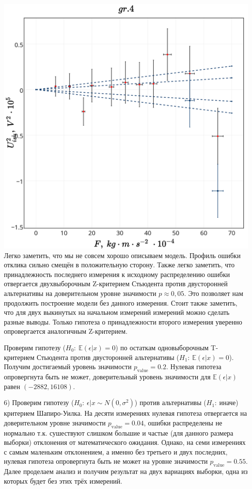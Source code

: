 \includegraphics[scale = 0.20]{my_plot4.png}\\

Легко заметить, что мы не совсем хорошо описываем модель. Профиль ошибки отклика сильно смещён в положительную сторону. Также легко заметить, что принадлежность последнего измерения к исходному распределению ошибки отвергается двухвыборочным Z-критерием Стьюдента против двусторонней альтернативы на доверительном уровне значимости $p\approx 0,05$. Это позволяет нам продолжить построение модели без данного измерения. Стоит также заметить, что для двух выкинутых на начальном измерений измерений можно сделать разные выводы. Только гипотеза о принадлежности второго измерения уверенно опровергается аналогичным Z-критерием. 

Проверим гипотезу ($H_0:~\mathds{E}(\epsilon | x) = 0$) по остаткам одновыборочным T-критерием Стьюдента против двусторонней альтернативы ($H_1:~\mathds{E} (\epsilon | x) = 0$).
Получим достигаемый уровень значимости $p_{\text{value}} = 0.2$. Нулевая гипотеза опровергнута быть не может, доверительный уровень значимости для $\mathds{E}(\epsilon | x)$ равен $(-2882, 16108)$.

6) Проверим гипотезу ($H_0:~\epsilon |x \sim N(0, \sigma^2) $) против альтернативы ($H_1:~\text{иначе}$) критерием Шапиро-Уилка.
На десяти измерениях нулевая гипотеза отвергается на доверительном уровне значимости $p_{\text{value}} = 0.04$, ошибки распределены не нормально т.к. сушествуют слишком большие и частые (для данного размера выборки) отклонения от математического ожидания.
Однако, на семи измерениях с самым маленьким отклонением, а именно без третьего и двух последних, нулевая гипотеза опровергнута быть не может на уровне значимости $p_{\text{value}} = 0.55$. Далее проделаем анализ и получим результат на двух вариациях выборки, одна из которых будет без этих 
трёх измерений.

